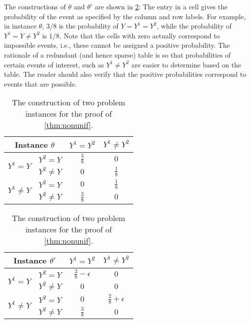 The constructions of $\theta$ and $\theta'$ are shown in \cref{tab:nonunif}:
The entry in a cell gives the probability of the event as specified by the column and row labels.
For example, in instance $\theta$, $3/8$ is the probability of $Y=Y^1=Y^2$, 
while the probability of $Y^1=Y\ne Y^2$ is $1/8$. Note that the cells with zero actually 
correspond to impossible events, i.e., these cannot be assigned a positive probability.
The rationale of a redundant (and hence sparse) table is so that probabilities of certain events of interest, such as $Y^1\ne Y^2$ are easier to determine based on the table. The reader should also verify that the positive probabilities correspond to events that are possible.
\bgroup
\def\arraystretch{1.5}
\begin{table}[]
	\centering
	\begin{tabular}{|c|c|c|c|}
		\hline
		\multicolumn{2}{|c|}{Instance $\theta$}  & $Y^1=Y^2$     & $Y^1\ne Y^2$  \\ \hline
		\multirow{2}{*}{$Y^1= Y$}   & $Y^2= Y$   & $\frac{3}{8}$ & $0$           \\ \cline{2-4} 
		& $Y^2\ne Y$ & $0$ & $\frac{1}{8}$ \\ \hline
		\multirow{2}{*}{$Y^1\ne Y$} & $Y^2= Y$   & $0$ & $\frac{1}{8}$           \\ \cline{2-4} 
		& $Y^2\ne Y$ & $\frac{3}{8}$ & $0$ \\ \hline
	\end{tabular}
	\begin{tabular}{|c|c|c|c|}
		\hline
		\multicolumn{2}{|c|}{Instance $\theta'$}  & $Y^1=Y^2$     & $Y^1\ne Y^2$  \\ \hline
		\multirow{2}{*}{$Y^1= Y$}   & $Y^2= Y$   & $\frac{3}{8}-\epsilon$ & $0$           \\ \cline{2-4} 
		& $Y^2\ne Y$ & $0$ & $0$ \\ \hline
		\multirow{2}{*}{$Y^1\ne Y$} & $Y^2= Y$   & $0$ & $\frac{2}{8}+\epsilon$           \\ \cline{2-4} 
		& $Y^2\ne Y$ & $\frac{3}{8}$ & $0$ \\ \hline
	\end{tabular}
	\vspace*{0.1in}
	\caption{The construction of two problem instances for the proof of \cref{thm:nonunif}.}
	\label{tab:nonunif}
\end{table}
\egroup

